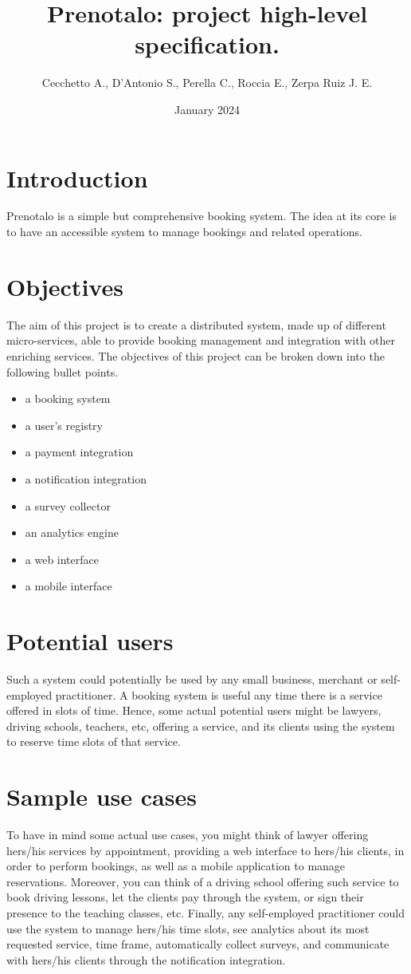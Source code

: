 \documentclass{article}
\title{Prenotalo: project high-level specification.}
\author{Cecchetto A., D'Antonio S., Perella C., Roccia E., Zerpa Ruiz J. E.}
\date{January 2024}
\begin{document}
\maketitle

\section{Introduction}
Prenotalo is a simple but comprehensive booking system. The idea at its core is to have an accessible system to manage bookings and related operations.

\section{Objectives}
The aim of this project is to create a distributed system, made up of different micro-services, able to provide booking management and integration with other enriching services. The objectives of this project can be broken down into the following bullet points.
\begin{itemize}
\item a booking system
\item a user's registry
\item a payment integration
\item a notification integration
\item a survey collector
\item an analytics engine
\item a web interface
\item a mobile interface
\end{itemize}

\section{Potential users}
Such a system could potentially be used by any small business, merchant or self-employed practitioner. A booking system is useful any time there is a service offered in slots of time. Hence, some actual potential users might be lawyers, driving schools, teachers, etc, offering a service, and its clients using the system to reserve time slots of that service.

\section{Sample use cases}
To have in mind some actual use cases, you might think of lawyer offering hers/his services by appointment, providing a web interface to hers/his clients, in order to perform bookings, as well as a mobile application to manage reservations. Moreover, you can think of a driving school offering such service to book driving lessons, let the clients pay through the system, or sign their presence to the teaching classes, etc. Finally, any self-employed practitioner could use the system to manage hers/his time slots, see analytics about its most requested service, time frame, automatically collect surveys, and communicate with hers/his clients through the notification integration.
\end{document}
